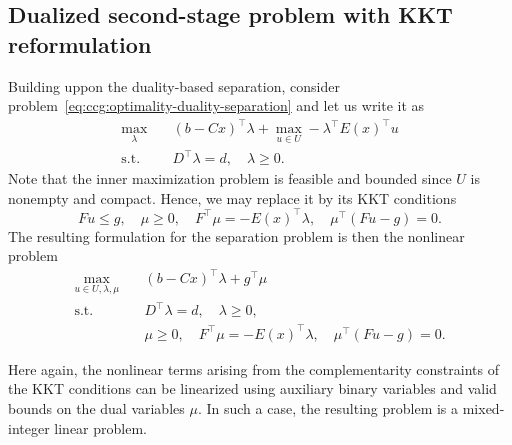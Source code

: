 \subsection{Dualized second-stage problem with KKT reformulation}


Building uppon the duality-based separation, consider
problem~\eqref{eq:ccg:optimality-duality-separation} and let us write it as 
\begin{subequations}
    \begin{align*}
        \max_{\lambda} \quad & (b - Cx)^\top\lambda + 
        \max_{u\in U} -\lambda^\top E(x)^\top u \\
        \text{s.t.} \quad & D^\top \lambda = d, \quad \lambda \ge 0.
    \end{align*}
\end{subequations}
Note that the inner maximization problem is feasible and bounded since $U$ is
nonempty and compact. Hence, we may replace it by its KKT conditions
\begin{equation*}
    Fu \le g, \quad \mu \ge 0, \quad F^\top\mu = -E(x)^\top\lambda, \quad \mu^\top( Fu - g ) = 0.
\end{equation*}
The resulting formulation for the separation problem is then the nonlinear
problem
\begin{subequations}
    \begin{align*}
        \max_{u\in U,\lambda,\mu} \quad & (b - Cx)^\top\lambda + g^\top\mu \\
        \text{s.t.} \quad & D^\top \lambda = d, \quad \lambda \ge 0, \\
        & \mu \ge 0, \quad F^\top\mu = -E(x)^\top\lambda, \quad \mu^\top( Fu - g ) = 0.
    \end{align*}
\end{subequations}

Here again, the nonlinear terms arising from the complementarity constraints
of the KKT conditions can be linearized using auxiliary binary variables and
valid bounds on the dual variables $\mu$. In such a case, the resulting
problem is a mixed-integer linear problem. 

\label{sec:ccg:two-stage-uflp}

